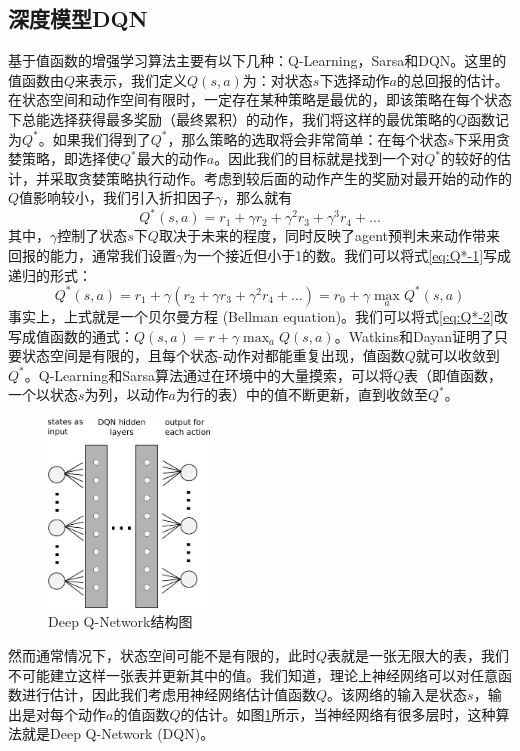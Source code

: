 \subsection{深度模型DQN}
基于值函数的增强学习算法主要有以下几种：Q-Learning，Sarsa和DQN。这里的值函数由$Q$来表示，我们定义$Q(s,a)$为：对状态$s$下选择动作$a$的总回报的估计。在状态空间和动作空间有限时，一定存在某种策略是最优的，即该策略在每个状态下总能选择获得最多奖励（最终累积）的动作，我们将这样的最优策略的$Q$函数记为$Q^*$。如果我们得到了$Q^*$，那么策略的选取将会非常简单：在每个状态$s$下采用贪婪策略，即选择使$Q^*$最大的动作$a$。因此我们的目标就是找到一个对$Q^*$的较好的估计，并采取贪婪策略执行动作。考虑到较后面的动作产生的奖励对最开始的动作的$Q$值影响较小，我们引入折扣因子$\gamma$，那么就有
\begin{equation}
    Q^*(s,a) = r_1 + \gamma r_2 + \gamma^2 r_3 + \gamma^3 r_4 + ...
\label{eq:Q*-1}
\end{equation}
其中，$\gamma$控制了状态$s$下$Q$取决于未来的程度，同时反映了agent预判未来动作带来回报的能力，通常我们设置$\gamma$为一个接近但小于1的数。我们可以将式\ref{eq:Q*-1}写成递归的形式：
\begin{equation}
    Q^*(s,a) = r_1 + \gamma(r_2 + \gamma r_3 + \gamma^2 r_4 + ...) = r_0 + \gamma \max_a Q^*(s,a)
    \label{eq:Q*-2}
\end{equation}
事实上，上式就是一个贝尔曼方程 (Bellman equation)。我们可以将式\ref{eq:Q*-2}改写成值函数的通式：$Q(s,a) = r + \gamma \max_a Q(s,a)$。Watkins和Dayan证明了\cite{watkins1988q}只要状态空间是有限的，且每个状态-动作对都能重复出现，值函数$Q$就可以收敛到$Q^*$。Q-Learning和Sarsa算法通过在环境中的大量摸索，可以将$Q$表（即值函数，一个以状态$s$为列，以动作$a$为行的表）中的值不断更新，直到收敛至$Q^*$。
\begin{figure}[ht]
    \centering
    \includegraphics[height=5cm]{figure/dqn.png}
    \caption{Deep Q-Network结构图}
    \label{fig:dqn}
\end{figure}
然而通常情况下，状态空间可能不是有限的，此时$Q$表就是一张无限大的表，我们不可能建立这样一张表并更新其中的值。我们知道，理论上神经网络可以对任意函数进行估计，因此我们考虑用神经网络估计值函数$Q$。该网络的输入是状态$s$，输出是对每个动作$a$的值函数$Q$的估计。如图\ref{fig:dqn}所示，当神经网络有很多层时，这种算法就是Deep Q-Network (DQN)。

